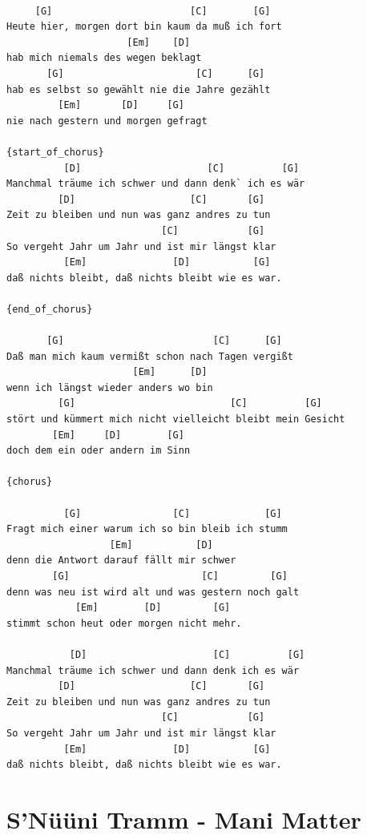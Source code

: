 \documentclass[]{book}
\let\stdsection\section
\renewcommand\section{\clearpage\stdsection}
\begin{document}
\begin{verbatim}

     [G]                        [C]        [G]
Heute hier, morgen dort bin kaum da muß ich fort
                     [Em]    [D]
hab mich niemals des wegen beklagt
       [G]                       [C]      [G]
hab es selbst so gewählt nie die Jahre gezählt
         [Em]       [D]     [G]
nie nach gestern und morgen gefragt

{start_of_chorus}
          [D]                      [C]          [G]
Manchmal träume ich schwer und dann denk` ich es wär
         [D]                    [C]       [G]
Zeit zu bleiben und nun was ganz andres zu tun
                           [C]            [G]
So vergeht Jahr um Jahr und ist mir längst klar
          [Em]               [D]           [G]
daß nichts bleibt, daß nichts bleibt wie es war.

{end_of_chorus}

       [G]                          [C]      [G]
Daß man mich kaum vermißt schon nach Tagen vergißt
                      [Em]      [D]
wenn ich längst wieder anders wo bin
         [G]                           [C]          [G]
stört und kümmert mich nicht vielleicht bleibt mein Gesicht
        [Em]     [D]        [G]
doch dem ein oder andern im Sinn

{chorus}

          [G]                [C]             [G]
Fragt mich einer warum ich so bin bleib ich stumm
                  [Em]           [D]
denn die Antwort darauf fällt mir schwer
        [G]                       [C]         [G]
denn was neu ist wird alt und was gestern noch galt
            [Em]        [D]         [G]
stimmt schon heut oder morgen nicht mehr.

           [D]                      [C]          [G]
Manchmal träume ich schwer und dann denk ich es wär
         [D]                    [C]       [G]
Zeit zu bleiben und nun was ganz andres zu tun
                           [C]            [G]
So vergeht Jahr um Jahr und ist mir längst klar
          [Em]               [D]           [G]
daß nichts bleibt, daß nichts bleibt wie es war.
\end{verbatim}

\hypertarget{snuuni-tramm---mani-matter}{%
\section{S'Nüüni Tramm - Mani Matter}\label{snuuni-tramm---mani-matter}}
\end{document}
